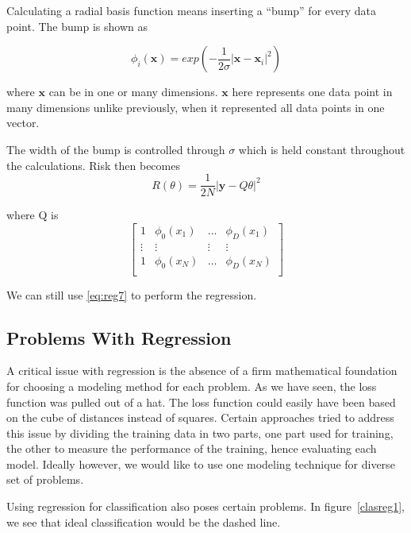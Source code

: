 \documentclass{ecctd01} %
\begin{document}
Calculating a radial basis function means inserting a ``bump'' for
every data point. The bump is shown as

\begin{displaymath}
  \phi_{i}(\mathbf{x}) = exp\left(
  -\frac{1}{2\sigma}\left|\mathbf{x} - \mathbf{x}_{i}\right|^2
  \right)
\end{displaymath}

where $\mathbf{x}$ can be in one or many dimensions. $\mathbf{x}$ here
represents one data point in many dimensions unlike previously, when
it represented all data points in one vector.

The width of the bump is controlled through $\sigma$ which is held
constant throughout the calculations. Risk then becomes  
\begin{equation}
  \label{eq:reg10}
  R(\theta) = \frac{1}{2N}|\mathbf{y} - Q\theta|^2
\end{equation}

where Q is 
\begin{displaymath}
  \label{eq:reg9}
  \left[ \begin{array}{cccc}
      1 & \phi_{0}(x_{1}) & \hdots & \phi_{D}(x_{1}) \\
      \vdots & \vdots & \vdots & \vdots \\
      1 & \phi_{0}(x_{N}) & \hdots & \phi_{D}(x_{N}) \\
  \end{array} \right]
\end{displaymath}

We can still use \eqref{eq:reg7} to perform the regression. 

\subsection{Problems With Regression}
A critical issue with regression is the absence of a firm mathematical
foundation for choosing a modeling method for each
problem. As we have seen, the loss function was pulled out of a
hat. The loss function could easily have been based on the cube of 
distances instead of squares. Certain approaches tried to address this
issue by dividing the training data in two parts, one part used for
training, the other to measure the performance of the training, hence
evaluating each model. Ideally however, we would like to use one
modeling technique for diverse set of problems.

Using regression for classification also poses certain problems. In
figure~\ref{clasreg1}, we see that ideal classification would be the
dashed line. 
\end{document}
